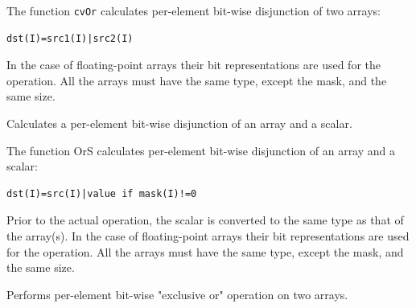 \begin{description}
\end{description}


The function \texttt{cvOr} calculates per-element bit-wise disjunction of two arrays:

\begin{lstlisting}
dst(I)=src1(I)|src2(I)
\end{lstlisting}

In the case of floating-point arrays their bit representations are used for the operation. All the arrays must have the same type, except the mask, and the same size.

\label{OrS}

Calculates a per-element bit-wise disjunction of an array and a scalar.


\begin{description}
\end{description}


The function OrS calculates per-element bit-wise disjunction of an array and a scalar:

\begin{lstlisting}
dst(I)=src(I)|value if mask(I)!=0
\end{lstlisting}

Prior to the actual operation, the scalar is converted to the same type as that of the array(s). In the case of floating-point arrays their bit representations are used for the operation. All the arrays must have the same type, except the mask, and the same size.


\label{Xor}

Performs per-element bit-wise "exclusive or" operation on two arrays.


